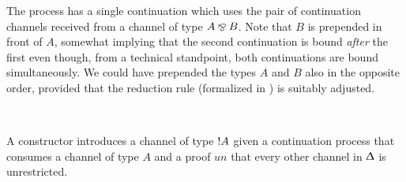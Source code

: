 \begin{AgdaAlign}
The  process has a single continuation which uses
the pair of continuation channels received from a channel of type $A \mathbin\bindnasrepma B$.
Note that $B$ is prepended in front of $A$, somewhat implying that the second
continuation is bound \emph{after} the first even though, from a technical
standpoint, both continuations are bound simultaneously. We could have prepended
the types $A$ and $B$ also in the opposite order, provided that the reduction
rule \RFork (formalized in ) is suitably adjusted.

\begin{code}%
%
\>[3]%
\>[13]\AgdaSymbol{:}%
\>[1638I]\AgdaSpace{}%
\AgdaSpace{}%
\AgdaSymbol{\}}\AgdaSpace{}%
\AgdaSymbol{(}\AgdaSpace{}%
\AgdaSymbol{:}\AgdaSpace{}%
\AgdaSpace{}%
\AgdaSpace{}%
\AgdaSpace{}%
\AgdaSpace{}%
\AgdaOperator{\AgdaFunction{,}}\AgdaSpace{}%
\AgdaSymbol{)}\AgdaSpace{}%
\AgdaSymbol{(}\AgdaSpace{}%
\AgdaSymbol{:}\AgdaSpace{}%
\AgdaSpace{}%
\AgdaSymbol{)}\AgdaSpace{}%
\<%
\\
\>[.][@{}l@{}]\<[1638I]%
\>[15]\AgdaSpace{}%
\AgdaSymbol{(}\AgdaSpace{}%
\AgdaSpace{}%
\AgdaSymbol{)}\AgdaSpace{}%
\AgdaSpace{}%
\AgdaSpace{}%
\<%
\end{code}

A  constructor introduces a channel of type
$\OfCourse A$ given a continuation process that consumes a channel of type $A$
and a proof $\mathit{un}$ that every other channel in $\Updelta$ is
unrestricted.


\end{AgdaAlign}
